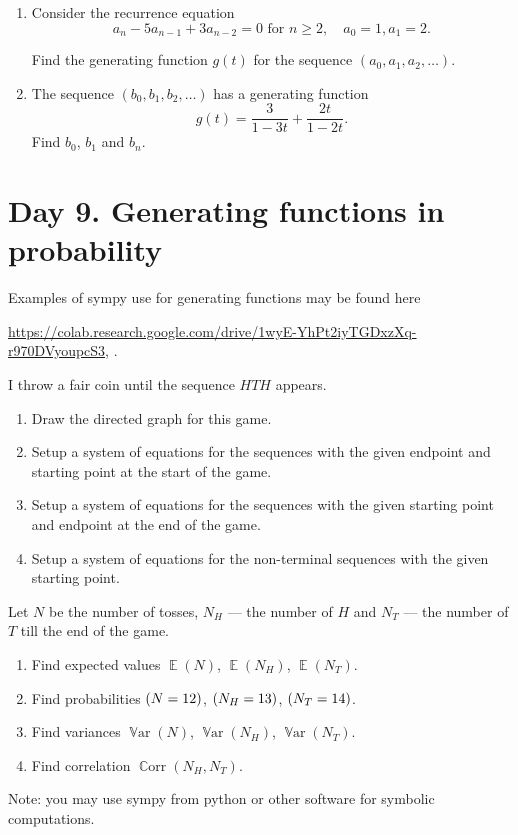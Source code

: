 \documentclass[12pt]{article}
\DeclareMathOperator{\Corr}{\mathbb{C}orr}
\DeclareMathOperator{\Var}{\mathbb{V}ar}
\let\P\relax
\DeclareMathOperator{\P}{\mathbb{P}}
\DeclareMathOperator{\E}{\mathbb{E}}
\begin{document}
\begin{enumerate}
Find the recurrence equation for $e_n$. You don't need to solve it. 

    \item Consider the recurrence equation 
    \[
    a_n - 5 a_{n-1} + 3a_{n-2} = 0 \text{ for } n\geq 2, \quad a_0 = 1, a_1 = 2.
    \]

    Find the generating function $g(t)$ for the sequence $(a_0, a_1, a_2, \dots)$. 

    \item The sequence $(b_0, b_1, b_2, \dots)$ has a generating function 
    \[
    g(t) = \frac{3}{1-3t} + \frac{2t}{1-2t}.
    \]
    Find $b_0$, $b_1$ and $b_n$.

\end{enumerate}



\section{Day 9. Generating functions in probability}

Examples of sympy use for generating functions may be found here

\url{https://colab.research.google.com/drive/1wyE-YhPt2iyTGDxzXq-r970DVyoupcS3}, .

\begin{exercise}
I throw a fair coin until the sequence $HTH$ appears.

\begin{enumerate}[label=\alph*)]
    \item Draw the directed graph for this game.
    \item Setup a system of equations for the sequences with the given endpoint and starting point at the start of the game. 
    \item Setup a system of equations for the sequences with the given starting point and endpoint at the end of the game. 
    \item Setup a system of equations for the non-terminal sequences with the given starting point.
\end{enumerate}
Let $N$ be the number of tosses, $N_H$ — the number of $H$ and $N_T$ — the number of $T$ till the end of the game. 
\begin{enumerate}[label=\alph*), resume]
    \item Find expected values $\E(N)$, $\E(N_H)$, $\E(N_T)$.
    \item Find probabilities $\P(N = 12)$, $\P(N_H = 13)$, $\P(N_T = 14)$.
    \item Find variances $\Var(N)$, $\Var(N_H)$, $\Var(N_T)$.
    \item Find correlation $\Corr(N_H, N_T)$.
\end{enumerate}

Note: you may use sympy from python or other software for symbolic computations. 
\end{exercise}
\end{document}
